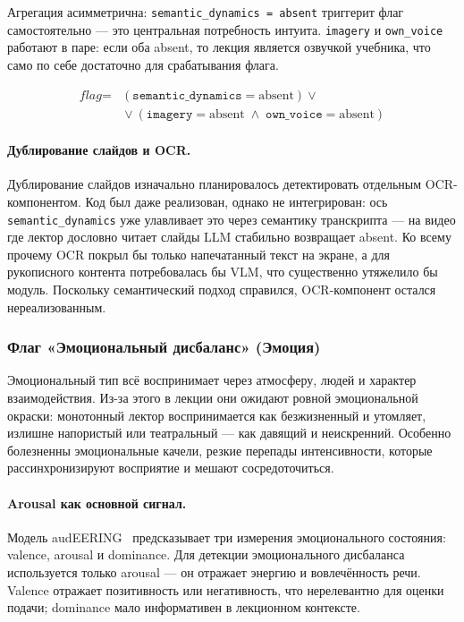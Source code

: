 Агрегация асимметрична: \texttt{semantic\_dynamics = absent} триггерит флаг
самостоятельно — это центральная потребность интуита.
\texttt{imagery} и \texttt{own\_voice} работают в паре:
если оба absent, то лекция является озвучкой учебника,
что само по себе достаточно для срабатывания флага.

\begin{equation}
\begin{aligned}
\textit{flag} ={}&
(\texttt{semantic\_dynamics} = \text{absent}) {}\lor\\
&{}\lor
(\texttt{imagery} = \text{absent}
\;\land\; \texttt{own\_voice} = \text{absent})
\end{aligned}
\end{equation}

\paragraph{Дублирование слайдов и OCR.}

Дублирование слайдов изначально планировалось детектировать отдельным OCR-компонентом.
Код был даже реализован, однако не интегрирован: ось \texttt{semantic\_dynamics}
уже улавливает это через семантику транскрипта —
на видео где лектор дословно читает слайды LLM стабильно возвращает absent.
Ко всему прочему OCR покрыл бы только напечатанный текст на экране, а
для рукописного контента потребовалась бы VLM, что существенно утяжелило бы модуль.
Поскольку семантический подход справился, OCR-компонент остался нереализованным.


\subsubsection{Флаг «Эмоциональный дисбаланс» (Эмоция)}

Эмоциональный тип всё воспринимает через атмосферу, людей и характер взаимодействия. Из-за этого в лекции они ожидают ровной эмоциональной окраски:
монотонный лектор воспринимается как безжизненный и утомляет,
излишне напористый или театральный — как давящий и неискренний.
Особенно болезненны эмоциональные качели, резкие перепады интенсивности,
которые рассинхронизируют восприятие и мешают сосредоточиться.

\paragraph{Arousal как основной сигнал.}

Модель audEERING~\cite{wagner2022transformerser} предсказывает три измерения
эмоционального состояния: valence, arousal и dominance.
Для детекции эмоционального дисбаланса используется только arousal —
он отражает энергию и вовлечённость речи.
Valence отражает позитивность или негативность, что нерелевантно для оценки подачи;
dominance мало информативен в лекционном контексте.

